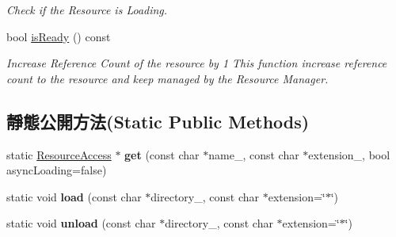 \begin{DoxyCompactItemize}
\begin{DoxyCompactList}\small\item\em Check if the Resource is Loading. \end{DoxyCompactList}\item 
bool \hyperlink{class_magnum_1_1_resource_access_a8451cc6dd389b29bb16fa4575614ba9a}{is\+Ready} () const \hypertarget{class_magnum_1_1_resource_access_a8451cc6dd389b29bb16fa4575614ba9a}{}\label{class_magnum_1_1_resource_access_a8451cc6dd389b29bb16fa4575614ba9a}

\begin{DoxyCompactList}\small\item\em Increase Reference Count of the resource by 1 This function increase reference count to the resource and keep managed by the Resource Manager. \end{DoxyCompactList}\end{DoxyCompactItemize}
\subsection*{靜態公開方法(Static Public Methods)}
\begin{DoxyCompactItemize}
\item 
static \hyperlink{class_magnum_1_1_resource_access}{Resource\+Access} $\ast$ {\bfseries get} (const char $\ast$name\+\_\+, const char $\ast$extension\+\_\+, bool async\+Loading=false)\hypertarget{class_magnum_1_1_resource_access_acc0a1ddf8d12b7c80839a07ec87a6dd8}{}\label{class_magnum_1_1_resource_access_acc0a1ddf8d12b7c80839a07ec87a6dd8}

\item 
static void {\bfseries load} (const char $\ast$directory\+\_\+, const char $\ast$extension=\char`\"{}$\ast$\char`\"{})\hypertarget{class_magnum_1_1_resource_access_abce2fed1d16d29afba7651ed4ebc6d00}{}\label{class_magnum_1_1_resource_access_abce2fed1d16d29afba7651ed4ebc6d00}

\item 
static void {\bfseries unload} (const char $\ast$directory\+\_\+, const char $\ast$extension=\char`\"{}$\ast$\char`\"{})\hypertarget{class_magnum_1_1_resource_access_a78e1244ae000d9ecc092be8ab34cdb89}{}\label{class_magnum_1_1_resource_access_a78e1244ae000d9ecc092be8ab34cdb89}

\end{DoxyCompactItemize}
